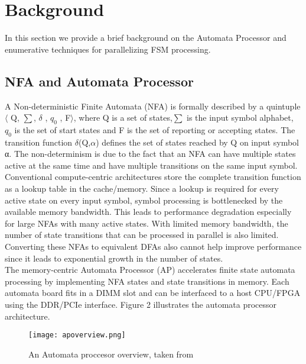 \section{\textbf{Background}}
In this section we provide a brief background on the Automata Processor and enumerative techniques for parallelizing FSM processing.
\subsection{NFA and Automata Processor}
A Non-deterministic Finite Automata (NFA) is formally described
by a quintuple $\langle$ Q, $\sum$, $\delta$ , $q_0$ , F$\rangle$, where Q is a set of states,$\sum$  is the
input symbol alphabet, $q_0$ is the set of start states and F is the set 
of reporting or accepting states. The transition function $\delta$(Q,$\alpha$)
defines the set of states reached by Q on input symbol α. The non-determinism is due to the fact that an NFA can have multiple states
active at the same time and have multiple transitions on the same
input symbol.\\
Conventional compute-centric architectures store the complete transition function as a lookup table in the cache/memory. Since a lookup
is required for every active state on every input symbol, symbol processing is bottlenecked by the available memory bandwidth. This
leads to performance degradation especially for large NFAs with
many active states. With limited memory bandwidth, the number
of state transitions that can be processed in parallel is also limited.
Converting these NFAs to equivalent DFAs also cannot help improve
performance since it leads to exponential growth in the number of
states.\\
The memory-centric Automata Processor (AP) accelerates finite
state automata processing by implementing NFA states and state
transitions in memory. Each automata board fits in a DIMM slot
and can be interfaced to a host CPU/FPGA using the DDR/PCIe
interface. Figure 2 illustrates the automata processor architecture.
\begin{figure}[!h]
\texttt{[image: apoverview.png]}
\centering
\caption{An Automata proccesor overview, taken from \cite{}}
\end{figure}

